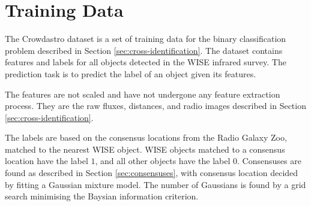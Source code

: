 \documentclass[11pt]{book}
\begin{document}
\section{Training Data}
\label{sec:training-data}
  
  The Crowdastro dataset is a set of training data for the binary classification problem described in Section \ref{sec:cross-identification}. The dataset contains features and labels for all objects detected in the WISE infrared survey. The prediction task is to predict the label of an object given its features.

  The features are not scaled and have not undergone any feature extraction process. They are the raw fluxes, distances, and radio images described in Section \ref{sec:cross-identification}.

  The labels are based on the consensus locations from the Radio Galaxy Zoo, matched to the nearest WISE object. WISE objects matched to a consensus location have the label $1$, and all other objects have the label $0$. Consensuses are found as described in Section \ref{sec:consensuses}, with consensus location decided by fitting a Gaussian mixture model. The number of Gaussians is found by a grid search minimising the Baysian information criterion.






\backmatter




\printindex
\end{document}
